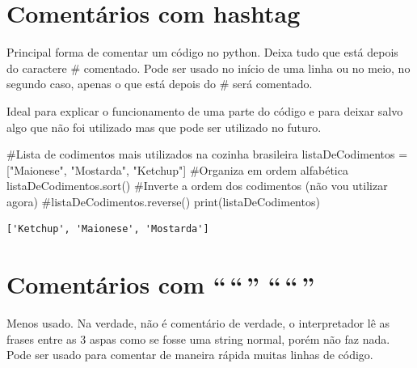 \documentclass[
  letterpaper,
  DIV=11,
  numbers=noendperiod]{scrreprt}
\newenvironment{Shaded}{\begin{snugshade}}{\end{snugshade}}
\newcommand{\BuiltInTok}[1]{\textcolor[rgb]{0.00,0.23,0.31}{#1}}
\newcommand{\CommentTok}[1]{\textcolor[rgb]{0.37,0.37,0.37}{#1}}
\newcommand{\NormalTok}[1]{\textcolor[rgb]{0.00,0.23,0.31}{#1}}
\newcommand{\OperatorTok}[1]{\textcolor[rgb]{0.37,0.37,0.37}{#1}}
\newcommand{\StringTok}[1]{\textcolor[rgb]{0.13,0.47,0.30}{#1}}
\begin{document}
\hypertarget{comentuxe1rios-com-hashtag}{%
\section{Comentários com hashtag}\label{comentuxe1rios-com-hashtag}}

Principal forma de comentar um código no python. Deixa tudo que está
depois do caractere \# comentado. Pode ser usado no início de uma linha
ou no meio, no segundo caso, apenas o que está depois do \# será
comentado.

Ideal para explicar o funcionamento de uma parte do código e para deixar
salvo algo que não foi utilizado mas que pode ser utilizado no futuro.

\begin{Shaded}
\begin{Highlighting}[]
\CommentTok{\#Lista de codimentos mais utilizados na cozinha brasileira}
\NormalTok{listaDeCodimentos }\OperatorTok{=}\NormalTok{ [}\StringTok{"Maionese"}\NormalTok{, }\StringTok{"Mostarda"}\NormalTok{, }\StringTok{"Ketchup"}\NormalTok{]}
\CommentTok{\#Organiza em ordem alfabética}
\NormalTok{listaDeCodimentos.sort()}
\CommentTok{\#Inverte a ordem dos codimentos (não vou utilizar agora)}
\CommentTok{\#listaDeCodimentos.reverse()}
\BuiltInTok{print}\NormalTok{(listaDeCodimentos)}
\end{Highlighting}
\end{Shaded}

\begin{tcolorbox}[enhanced jigsaw, breakable, leftrule=.75mm, left=2mm, opacityback=0, bottomrule=.15mm, toprule=.15mm, rightrule=.15mm, arc=.35mm, colback=white]

\begin{verbatim}
['Ketchup', 'Maionese', 'Mostarda']
\end{verbatim}

\end{tcolorbox}

\hypertarget{comentuxe1rios-com}{%
\section{Comentários com ``\,``\,''
``\,``\,''}\label{comentuxe1rios-com}}

Menos usado. Na verdade, não é comentário de verdade, o interpretador lê
as frases entre as 3 aspas como se fosse uma string normal, porém não
faz nada. Pode ser usado para comentar de maneira rápida muitas linhas
de código.
\end{document}
